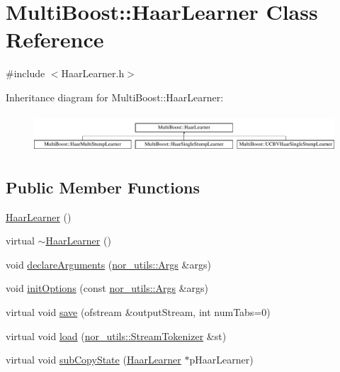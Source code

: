 \hypertarget{classMultiBoost_1_1HaarLearner}{
\section{MultiBoost::HaarLearner Class Reference}
\label{classMultiBoost_1_1HaarLearner}
}


{\ttfamily \#include $<$HaarLearner.h$>$}

Inheritance diagram for MultiBoost::HaarLearner:\begin{figure}[H]
\begin{center}
\leavevmode
\includegraphics[height=1.435897cm]{classMultiBoost_1_1HaarLearner}
\end{center}
\end{figure}
\subsection*{Public Member Functions}
\begin{DoxyCompactItemize}
\item 
\hyperlink{classMultiBoost_1_1HaarLearner_ae155d1ab4c52786488183d797c244313}{HaarLearner} ()
\item 
virtual \hyperlink{classMultiBoost_1_1HaarLearner_a7fc3c0ebc3804e78a85e906fe79fb763}{$\sim$HaarLearner} ()
\item 
void \hyperlink{classMultiBoost_1_1HaarLearner_a5b59a15acc9fc35301ad6813ea54ad21}{declareArguments} (\hyperlink{classnor__utils_1_1Args}{nor\_\-utils::Args} \&args)
\item 
void \hyperlink{classMultiBoost_1_1HaarLearner_ab9daa7951f4d74ed85e7feeca7d1b744}{initOptions} (const \hyperlink{classnor__utils_1_1Args}{nor\_\-utils::Args} \&args)
\item 
virtual void \hyperlink{classMultiBoost_1_1HaarLearner_ae8837229c0e3e39431a8b0fd12d58291}{save} (ofstream \&outputStream, int numTabs=0)
\item 
virtual void \hyperlink{classMultiBoost_1_1HaarLearner_a44c313549dd080a952b57eec400f022e}{load} (\hyperlink{classnor__utils_1_1StreamTokenizer}{nor\_\-utils::StreamTokenizer} \&st)
\item 
virtual void \hyperlink{classMultiBoost_1_1HaarLearner_a9a2b6ca97cc29151e1b05b8d32ba52e7}{subCopyState} (\hyperlink{classMultiBoost_1_1HaarLearner}{HaarLearner} $\ast$pHaarLearner)
\end{DoxyCompactItemize}
